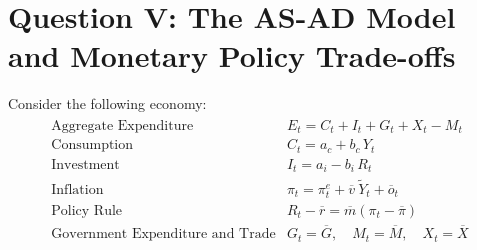 \documentclass[letterpaper,12pt]{article}
\theoremstyle{dotlessS}
\begin{document}
\section*{Question V: The AS-AD Model and Monetary Policy Trade-offs}
Consider the following economy:
\begin{eqnarray*}
\begin{array}{ll}
\text{Aggregate Expenditure} & E_t = C_t + I_t + G_t + X_t - M_t \\[1.4ex]
\text{Consumption} & C_t = a_c + b_c\,Y_t \\[1.4ex]
\text{Investment} & I_t = a_i - b_i\,R_t \\[1.4ex]
\text{Inflation} & \pi_t = \pi^e_t + \overline{v}\:\widetilde{Y}_t + \overline{o}_t  \\[1.4ex]
\text{Policy Rule} & R_t - \overline{r} = \overline{m}(\pi_t - \overline{\pi})  \\[1.4ex]
\text{Government Expenditure and Trade} & G_t = \overline{G}, \quad M_t = \overline{M}, \quad X_t = \overline{X}
\end{array}
\end{eqnarray*}
\end{document}
